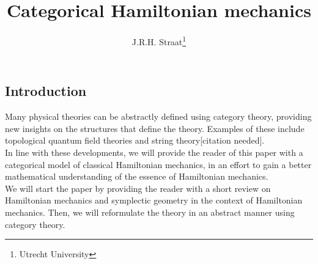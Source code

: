 \documentclass{article}
\title{Categorical Hamiltonian mechanics}
\author{J.R.H. Straat\thanks{Utrecht University}}%
\date{}
\begin{document}
\maketitle

\begin{multicols}{2}
	\section{Introduction}
	Many physical theories can be abstractly defined using category theory, providing new insights on the structures that define the theory. Examples of these include topological quantum field theories\cite{BaezTQFT} and string theory[citation needed].\\%
	In line with these developments, we will provide the reader of this paper with a categorical model of classical Hamiltonian mechanics, in an effort to gain a better mathematical understanding of the essence of Hamiltonian mechanics.\\
	We will start the paper by providing the reader with a short review on Hamiltonian mechanics and symplectic geometry in the context of Hamiltonian mechanics. Then, we will reformulate the theory in an abstract manner using category theory.

\end{multicols}
\end{document}
